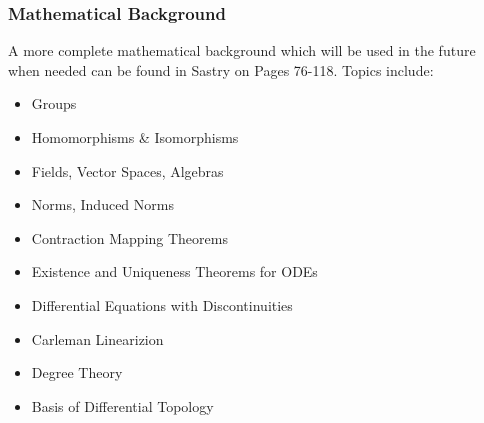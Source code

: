 \documentclass[show notes]{beamer}       %
\begin{document}
\begin{frame}
\frametitle{Mathematical Background}
A more complete mathematical background which will be used in the future when needed can be found in Sastry on Pages 76-118. Topics include:
\begin{itemize}
\item Groups
\item Homomorphisms \& Isomorphisms
\item Fields, Vector Spaces, Algebras
\item Norms, Induced Norms
\item Contraction Mapping Theorems
\item Existence and Uniqueness Theorems for ODEs
\item Differential Equations with Discontinuities
\item Carleman Linearizion
\item Degree Theory
\item Basis of Differential Topology
\end{itemize}
\end{frame}
\end{document}
